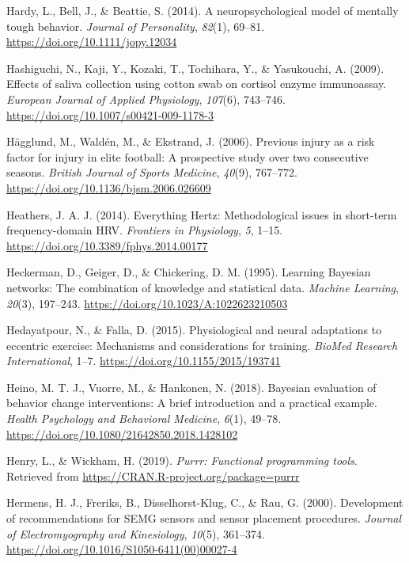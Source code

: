 \documentclass[
  english,
  man,floatsintext]{apa6}
\begin{document}
\leavevmode\hypertarget{ref-Hardy2014}{}%
Hardy, L., Bell, J., \& Beattie, S. (2014). A neuropsychological model of mentally tough behavior. \emph{Journal of Personality}, \emph{82}(1), 69--81. \url{https://doi.org/10.1111/jopy.12034}

\leavevmode\hypertarget{ref-Hashiguchi2009}{}%
Hashiguchi, N., Kaji, Y., Kozaki, T., Tochihara, Y., \& Yasukouchi, A. (2009). Effects of saliva collection using cotton swab on cortisol enzyme immunoassay. \emph{European Journal of Applied Physiology}, \emph{107}(6), 743--746. \url{https://doi.org/10.1007/s00421-009-1178-3}

\leavevmode\hypertarget{ref-Hagglund2006}{}%
Hägglund, M., Waldén, M., \& Ekstrand, J. (2006). Previous injury as a risk factor for injury in elite football: A prospective study over two consecutive seasons. \emph{British Journal of Sports Medicine}, \emph{40}(9), 767--772. \url{https://doi.org/10.1136/bjsm.2006.026609}

\leavevmode\hypertarget{ref-Heathers2014}{}%
Heathers, J. A. J. (2014). Everything Hertz: Methodological issues in short-term frequency-domain HRV. \emph{Frontiers in Physiology}, \emph{5}, 1--15. \url{https://doi.org/10.3389/fphys.2014.00177}

\leavevmode\hypertarget{ref-Heckerman1995}{}%
Heckerman, D., Geiger, D., \& Chickering, D. M. (1995). Learning Bayesian networks: The combination of knowledge and statistical data. \emph{Machine Learning}, \emph{20}(3), 197--243. \url{https://doi.org/10.1023/A:1022623210503}

\leavevmode\hypertarget{ref-Hedayatpour2015}{}%
Hedayatpour, N., \& Falla, D. (2015). Physiological and neural adaptations to eccentric exercise: Mechanisms and considerations for training. \emph{BioMed Research International}, 1--7. \url{https://doi.org/10.1155/2015/193741}

\leavevmode\hypertarget{ref-Heino2018}{}%
Heino, M. T. J., Vuorre, M., \& Hankonen, N. (2018). Bayesian evaluation of behavior change interventions: A brief introduction and a practical example. \emph{Health Psychology and Behavioral Medicine}, \emph{6}(1), 49--78. \url{https://doi.org/10.1080/21642850.2018.1428102}

\leavevmode\hypertarget{ref-R-purrr}{}%
Henry, L., \& Wickham, H. (2019). \emph{Purrr: Functional programming tools}. Retrieved from \url{https://CRAN.R-project.org/package=purrr}

\leavevmode\hypertarget{ref-Hermens2000}{}%
Hermens, H. J., Freriks, B., Disselhorst-Klug, C., \& Rau, G. (2000). Development of recommendations for SEMG sensors and sensor placement procedures. \emph{Journal of Electromyography and Kinesiology}, \emph{10}(5), 361--374. \url{https://doi.org/10.1016/S1050-6411(00)00027-4}
\end{document}
